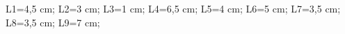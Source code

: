 \documentclass[exercice]{thedocument}%
\begin{document}
%
\>L1=4,5 cm;%
\>L2=3 cm;%
\>L3=1 cm;%
\>L4=6,5 cm;%
\>L5=4 cm;%
\>L6=5 cm;%
\>L7=3,5 cm;%
\>L8=3,5 cm;%
\>L9=7 cm;%
%
\end{document}
